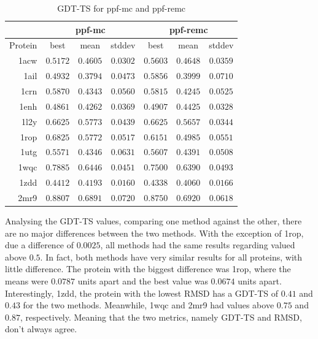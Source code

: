 \begin{table}
  \centering
  \begin{tabular}{r|c|c|c||c|c|c}
            & \multicolumn{3}{c}{ppf-mc} & \multicolumn{3}{||c}{ppf-remc} \\ \hline
    Protein & best          & mean          & stddev   & best          & mean          & stddev   \\ \hline \hline
    1acw    & $\bm{0.5172}$ & $0.4605$      & $0.0302$ & $\bm{0.5603}$ & $0.4648$      & $0.0359$ \\ \hline
    1ail    & $0.4932$      & $0.3794$      & $0.0473$ & $\bm{0.5856}$ & $0.3999$      & $0.0710$ \\ \hline
    1crn    & $\bm{0.5870}$ & $0.4343$      & $0.0560$ & $\bm{0.5815}$ & $0.4245$      & $0.0525$ \\ \hline
    1enh    & $0.4861$      & $0.4262$      & $0.0369$ & $0.4907$      & $0.4425$      & $0.0328$ \\ \hline
    1l2y    & $\bm{0.6625}$ & $\bm{0.5773}$ & $0.0439$ & $\bm{0.6625}$ & $\bm{0.5657}$ & $0.0344$ \\ \hline
    1rop    & $\bm{0.6825}$ & $\bm{0.5772}$ & $0.0517$ & $\bm{0.6151}$ & $0.4985$      & $0.0551$ \\ \hline
    1utg    & $\bm{0.5571}$ & $0.4346$      & $0.0631$ & $\bm{0.5607}$ & $0.4391$      & $0.0508$ \\ \hline
    1wqc    & $\bm{0.7885}$ & $\bm{0.6446}$ & $0.0451$ & $\bm{0.7500}$ & $\bm{0.6390}$ & $0.0493$ \\ \hline
    1zdd    & $0.4412$      & $0.4193$      & $0.0160$ & $0.4338$      & $0.4060$      & $0.0166$ \\ \hline
    2mr9    & $\bm{0.8807}$ & $\bm{0.6891}$ & $0.0720$ & $\bm{0.8750}$ & $\bm{0.6920}$ & $0.0618$ \\ \hline
  \end{tabular}
  \caption{GDT-TS for ppf-mc and ppf-remc}
  \label{tab:gdtts-data}
\end{table}

Analysing the GDT-TS values, comparing one method against the other, there are no
major differences between the two methods.
With the exception of 1rop, due a difference of $0.0025$, all
methods had the same results regarding valued above $0.5$. In fact, both methods
have very similar results for all proteins, with little difference. The protein
with the biggest difference was 1rop, where the means were $0.0787$ units apart
and the best value was $0.0674$ units apart. Interestingly, 1zdd, the protein
with the lowest RMSD has a GDT-TS of $0.41$ and $0.43$ for the two methods.
Meanwhile, 1wqc and 2mr9 had values above $0.75$ and $0.87$, respectively.
Meaning that the two metrics, namely GDT-TS and RMSD, don't always agree.

